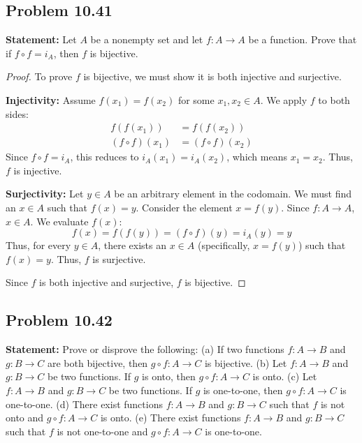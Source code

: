 \documentclass[11pt, a4paper]{article}
\theoremstyle{definition}
\theoremstyle{remark}
\begin{document}
\subsection*{Problem 10.41}
\textbf{Statement:} Let $A$ be a nonempty set and let $f: A \to A$ be a function. Prove that if $f \circ f = i_A$, then $f$ is bijective.

\begin{proof}
To prove $f$ is bijective, we must show it is both injective and surjective.

\textbf{Injectivity:} Assume $f(x_1) = f(x_2)$ for some $x_1, x_2 \in A$. We apply $f$ to both sides:
\begin{align*}
    f(f(x_1)) &= f(f(x_2)) \\
    (f \circ f)(x_1) &= (f \circ f)(x_2)
\end{align*}
Since $f \circ f = i_A$, this reduces to $i_A(x_1) = i_A(x_2)$, which means $x_1 = x_2$. Thus, $f$ is injective.

\textbf{Surjectivity:} Let $y \in A$ be an arbitrary element in the codomain. We must find an $x \in A$ such that $f(x) = y$. Consider the element $x = f(y)$. Since $f: A \to A$, $x \in A$. We evaluate $f(x)$:
\[ f(x) = f(f(y)) = (f \circ f)(y) = i_A(y) = y \]
Thus, for every $y \in A$, there exists an $x \in A$ (specifically, $x = f(y)$) such that $f(x) = y$. Thus, $f$ is surjective.

Since $f$ is both injective and surjective, $f$ is bijective.
\end{proof}

\subsection*{Problem 10.42}
\textbf{Statement:} Prove or disprove the following:
(a) If two functions $f: A \to B$ and $g: B \to C$ are both bijective, then $g \circ f: A \to C$ is bijective.
(b) Let $f: A \to B$ and $g: B \to C$ be two functions. If $g$ is onto, then $g \circ f: A \to C$ is onto.
(c) Let $f: A \to B$ and $g: B \to C$ be two functions. If $g$ is one-to-one, then $g \circ f: A \to C$ is one-to-one.
(d) There exist functions $f: A \to B$ and $g: B \to C$ such that $f$ is not onto and $g \circ f: A \to C$ is onto.
(e) There exist functions $f: A \to B$ and $g: B \to C$ such that $f$ is not one-to-one and $g \circ f: A \to C$ is one-to-one.
\end{document}
